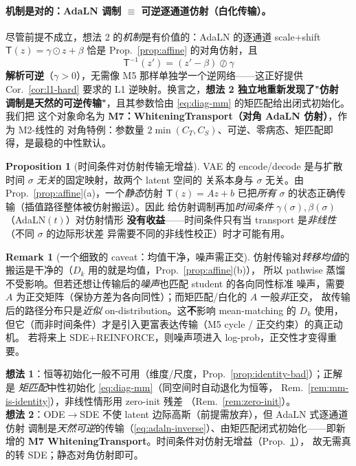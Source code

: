\documentclass[11pt,a4paper]{article}
\newcommand{\Tmap}{\mathsf{T}}
\theoremstyle{definition}
\newtheorem{remark}{Remark}
\newtheorem{proposition}{Proposition}
\begin{document}
\paragraph{机制是对的：AdaLN 调制 $\equiv$ 可逆逐通道仿射（白化传输）。}
尽管前提不成立，想法 2 的\emph{机制}是有价值的：AdaLN 的逐通道 scale+shift
$\Tmap(z)=\gamma\odot z+\beta$ 恰是 Prop.~\ref{prop:affine} 的对角仿射，且
\begin{equation}
\Tmap^{-1}(z')=(z'-\beta)\oslash\gamma
\label{eq:adaln-inverse}
\end{equation}
\textbf{解析可逆}（$\gamma>0$），无需像 M5 那样单独学一个逆网络——这正好提供
Cor.~\ref{cor:l1-hard} 要求的 L1 逆映射。换言之，\textbf{想法 2 独立地重新发现了"仿射
调制是天然的可逆传输"}，且其参数恰由 \eqref{eq:diag-mm} 的矩匹配给出闭式初始化。我们把
这个对象命名为 \textbf{M7：WhiteningTransport（对角 AdaLN 仿射）}，作为 M2-线性的
对角特例：参数量 $2\min(C_T,C_S)$、可逆、零病态、矩匹配即得，是最稳的中性默认。

\begin{proposition}[时间条件对仿射传输无增益]
\label{prop:no-time-cond}
VAE 的 encode/decode 是与扩散时间 $\sigma$ \emph{无关}的固定映射，故两个 latent 空间的
关系本身与 $\sigma$ 无关。由 Prop.~\ref{prop:affine}(a)，一个\emph{静态}仿射
$\Tmap(z)=Az+b$ 已把\emph{所有} $\sigma$ 的状态正确传输（插值路径整体被仿射搬运）。因此
给仿射调制再加\emph{时间条件} $\gamma(\sigma),\beta(\sigma)$（AdaLN$(t)$）对仿射情形
\textbf{没有收益}——时间条件只有当 transport 是\emph{非线性}（不同 $\sigma$ 的边际形状差
异需要不同的非线性校正）时才可能有用。
\end{proposition}

\begin{remark}[一个细致的 caveat：均值干净，噪声需正交]
\label{rem:orthogonal-noise}
仿射传输对\emph{转移均值}的搬运是干净的（$D_k$ 用的就是均值，Prop.~\ref{prop:affine}(b)），
所以 pathwise 蒸馏不受影响。但若还想让传输后的\emph{噪声}也匹配 student 的各向同性标准
噪声，需要 $A$ 为正交矩阵（保协方差为各向同性）；而矩匹配/白化的 $A$ 一般\emph{非}正交，
故传输后的路径分布只是\emph{近似} on-distribution。这\textbf{不}影响 mean-matching 的
$D_k$ 使用，但它（而非时间条件）才是引入更富表达传输（M5 cycle / 正交约束）的真正动机。
若将来上 SDE+REINFORCE，则噪声项进入 log-prob，正交性才变得重要。
\end{remark}

\begin{tcolorbox}[colback=blue!4,colframe=blue!50!black,title=两个想法的结论]
\textbf{想法 1}：恒等初始化一般不可用（维度/尺度，Prop.~\ref{prop:identity-bad}）；正解是
\emph{矩匹配}中性初始化 \eqref{eq:diag-mm}（同空间时自动退化为恒等，
Rem.~\ref{rem:mm-is-identity}），非线性情形用 zero-init 残差
（Rem.~\ref{rem:zero-init}）。\\
\textbf{想法 2}：ODE$\to$SDE 不使 latent 边际高斯（前提需放弃），但 AdaLN 式逐通道仿射
调制是\emph{天然可逆}的传输（\eqref{eq:adaln-inverse}）、由矩匹配闭式初始化——即新增的
\textbf{M7 WhiteningTransport}。时间条件对仿射无增益（Prop.~\ref{prop:no-time-cond}），
故无需真的转 SDE；静态对角仿射即可。
\end{tcolorbox}
\end{document}
